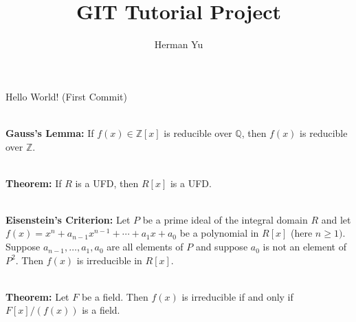 \documentclass[12pt]{article}
\begin{document}
\title{GIT Tutorial Project}
\date{}
\author{Herman Yu}
\maketitle

Hello World! (First Commit)\par 
\hfill \\
\textbf{Gauss's Lemma:} If $f(x)\in \mathbb{Z}[x]$ is reducible over $\mathbb{Q}$, then $f(x)$ is reducible over $\mathbb{Z}$.\par 
\hfill \\
\textbf{Theorem:} If $R$ is a UFD, then $R[x]$ is a UFD.\par 
\hfill \\
\textbf{Eisenstein's Criterion:} Let $P$ be a prime ideal of the integral domain $R$ and let $f(x)=x^n+a_{n-1}x^{n-1}+\cdots + a_1x+a_0$ be a polynomial in $R[x]$ (here $n\geq 1)$. Suppose $a_{n-1},\dots, a_1,a_0$ are all elements of $P$ and suppose $a_0$ is not an element of $P^2$. Then $f(x)$ is irreducible in $R[x]$.\par 
\hfill \\
\textbf{Theorem:} Let $F$ be a field. Then $f(x)$ is irreducible if and only if $F[x]/(f(x))$ is a field.\par 
\end{document}
